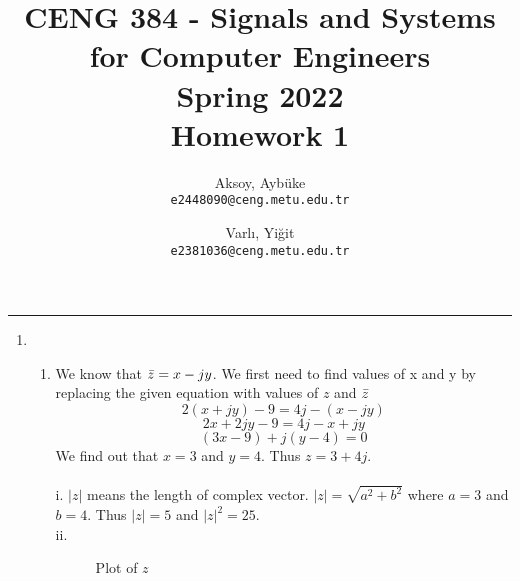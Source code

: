 \documentclass[10pt,a4paper, margin=1in]{article}
\author{
  Aksoy, Aybüke\\
  \texttt{e2448090@ceng.metu.edu.tr}
  \and
  Varlı, Yiğit\\
  \texttt{e2381036@ceng.metu.edu.tr}
}
\title{CENG 384 - Signals and Systems for Computer Engineers \\
Spring 2022 \\
Homework 1}
\begin{document}
\maketitle



\noindent\rule{19cm}{1.2pt}

\begin{enumerate}

\item %
    \begin{enumerate}
    \item We know that $\Bar{z} = x - jy$. We first need to find values of x and y by replacing the given equation with values of $z$ and $\Bar{z}$
    \[2(x + jy) - 9 = 4j - (x - jy)\]
    \[2x + 2jy - 9 = 4j - x + jy\]
    \[(3x-9) + j(y-4) = 0\]
    We find out that $x = 3$ and $y=4$. Thus $z = 3 + 4j$. \\\\
    i. $|z|$ means the length of complex vector. $|z| = \sqrt{a^2 + b^2}$ where $a=3$ and $b=4$. Thus $|z| = 5$ and $|z|^2 = 25$.\\
    ii. \begin{figure}[H]
     \centering
         \caption{Plot of $z$}
         \label{fig:plotz}
     \end{figure}
     

\end{enumerate}
\end{enumerate}
\end{document}
